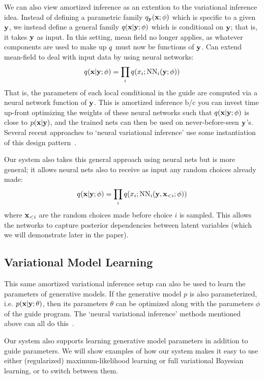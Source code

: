 We can also view amortized inference as an extention to the variational inference idea.
Instead of defining a parametric family $q_{\mathbf{y}}(\mathbf{x} ; \phi)$ which is specific to a given $\mathbf{y}$, we instead define a general family $q(\mathbf{x} | \mathbf{y} ; \phi)$ which is conditional on $\mathbf{y}$; that is, it takes $\mathbf{y}$ as input.
In this setting, mean field no longer applies, as whatever components are used to make up $q$ must now be functions of $\mathbf{y}$.
Can extend mean-field to deal with input data by using neural networks:
\begin{equation*}
q(\mathbf{x} | \mathbf{y} ; \phi) = \prod_i q(x_i ; \text{NN}_i(\mathbf{y} ; \phi))
\end{equation*}
That is, the parameters of each local conditional in the guide are computed via a neural network function of $\mathbf{y}$.
This is amortized inference b/c you can invest time up-front optimizing the weights of these neural networks such that $q(\mathbf{x} | \mathbf{y} ; \phi)$ is close to $p(\mathbf{x} | \mathbf{y})$, and the trained nets can then be used on never-before-seen $\mathbf{y}$'s.
Several recent approaches to `neural variational inference' use some instantiation of this design pattern~\cite{NVIL,DLGM,AEVB}.

Our system also takes this general approach using neural nets but is more general; it allows neural nets also to receive as input any random choices already made:
\begin{equation*}
q(\mathbf{x} | \mathbf{y} ; \phi) = \prod_i q(x_i ; \text{NN}_i(\mathbf{y}, \mathbf{x}_{<i} ; \phi))
\end{equation*}
where $\mathbf{x}_{<i}$ are the random choices made before choice $i$ is sampled. This allows the networks to capture posterior dependencies between latent variables (which we will demonstrate later in the paper).

\subsection{Variational Model Learning}

This same amortized variational inference setup can also be used to learn the parameters of generative models. If the generative model $p$ is also parameterized, i.e. $p(\mathbf{x} | \mathbf{y} ; \theta)$, then its parameters $\theta$ can be optimized along with the parameters $\phi$ of the guide program.
The `neural variational inference' methods mentioned above can all do this~\cite{NVIL,DLGM,AEVB}.

Our system also supports learning generative model parameters in addition to guide parameters.
We will show examples of how our system makes it easy to use either (regularized) maximum-likelihood learning or full variational Bayesian learning, or to switch between them.

